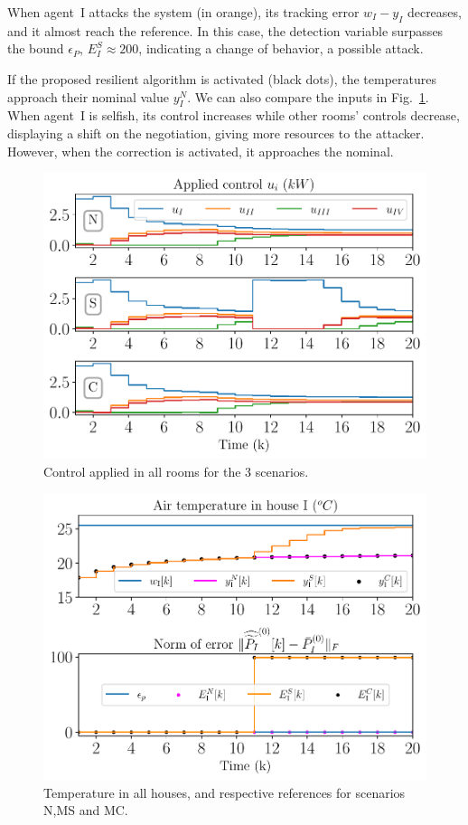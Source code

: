 \documentclass[../main.tex]{subfiles}
\begin{document}
When agent~I attacks the system (in orange), its tracking error
${w_{I}-y_{I}}$ decreases, and it almost reach the reference.
In this case, the detection variable surpasses the bound $\epsilon_{P}$,
${E_{I}^{S}\approx200}$, indicating a change of behavior, a possible attack.

If the proposed resilient algorithm is activated (black dots), the temperatures approach their nominal value $y_{I}^{N}$.
We can also compare the inputs in Fig.~\ref{fig:control_3Scenarios}.
When agent~I is selfish, its control increases while other rooms' controls decrease,
displaying a shift on the negotiation, giving more resources to the attacker.
However, when the correction is activated, it approaches the nominal.
\begin{figure}[h]
  \centering
 \includegraphics[width=.7\textwidth,trim=0 .1cm 0 .3cm,clip]{../img/resilient_ineq/control.pdf}
  \caption{Control applied in all rooms for the 3 scenarios.}\label{fig:control_3Scenarios}
\end{figure}

\begin{figure}[h]
  \centering
  \includegraphics[width=.7\textwidth]{../img/resilient_ineq/__ErrorWX_command_normErrH.pdf}
\caption{Temperature in all houses, and respective references for scenarios N,MS and MC. }\label{fig:response_houses_N_M_as}
\end{figure}
\end{document}

